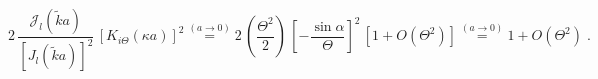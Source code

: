 \begin{equation}
2 \,
\frac{\mathcal J_{l} 
( \tilde{k} a )}{ \left[ J_{l}(\tilde{k} a) \right]^{2} }
\,
\left[ K_{i \Theta} (\kappa a) \right]^{2}
\stackrel{(a \rightarrow 0)}{=}
2 \,
 \left( \frac{\Theta^{2} }{2} \right)  \,
\left[- \frac{\sin \alpha}{\Theta} \right] ^{2} 
\,
\left[ 1 + O(\Theta^{2}) \right]
\stackrel{(a \rightarrow 0)}{=}
1 + O(\Theta^{2}) 
\; .
\end{equation}

